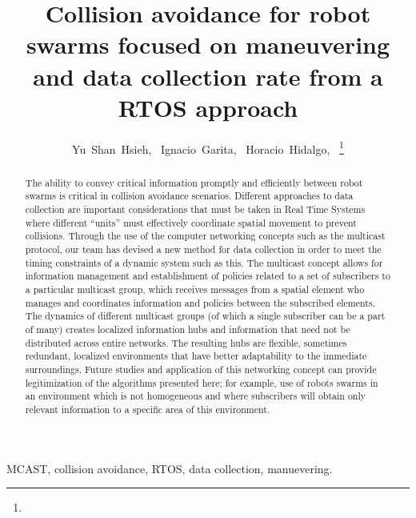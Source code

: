 \documentclass[journal]{IEEEtran}
\begin{document}
\title{Collision avoidance for robot swarms focused on maneuvering and data collection rate from a RTOS approach}

\author{Yu~Shan~Hsieh,~
	Ignacio~Garita,~
        Horacio~Hidalgo,~%
\thanks{}%
%
}

\maketitle

\begin{abstract}
The ability to convey critical information promptly and efficiently between robot
swarms is critical in collision avoidance scenarios. Different approaches to data collection
are important considerations that must be taken in Real Time Systems where different “units” must
effectively coordinate spatial movement to prevent collisions. Through the use of the computer
networking concepts such as the multicast protocol, our team has devised a new method for
data collection in order to meet the timing constraints of a dynamic system such as this. The multicast
concept allows for information management and establishment of policies related to a set of
subscribers to a particular multicast group, which receives messages from a spatial element who
manages and coordinates information and policies between the subscribed elements. The dynamics
of different multicast groups (of which a single subscriber can be a part of many) creates localized
information hubs and information that need not be distributed across entire networks. The resulting
hubs are flexible, sometimes redundant, localized environments that have better adaptability
to the immediate surroundings. Future studies and application of this networking concept can
provide legitimization of the algorithms presented here; for example, use of robots swarms in an
environment which is not homogeneous and where subscribers will obtain only relevant information
to a specific area of this environment.
\end{abstract}

\begin{IEEEkeywords}
MCAST, collision avoidance, RTOS, data collection, manuevering.
\end{IEEEkeywords}
\end{document}
